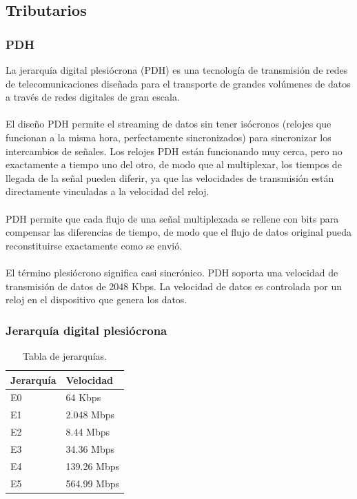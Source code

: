 \documentclass[12pt,letterpaper]{article}
\begin{document}
\subsection{Tributarios}
\subsubsection{PDH}
La jerarquía digital plesiócrona (PDH) es una tecnología de transmisión de redes de 
telecomunicaciones diseñada para el transporte de grandes volúmenes de datos a través de 
redes digitales de gran escala.
\\ \\
El diseño PDH permite el streaming de datos sin tener isócronos (relojes que funcionan a 
la misma hora, perfectamente sincronizados) para sincronizar los intercambios de señales. 
Los relojes PDH están funcionando muy cerca, pero no exactamente a tiempo uno del otro, 
de modo que al multiplexar, los tiempos de llegada de la señal pueden diferir, ya que 
las velocidades de transmisión están directamente vinculadas a la velocidad del reloj. 
\\ \\
PDH permite que cada flujo de una señal multiplexada se rellene con bits para compensar 
las diferencias de tiempo, de modo que el flujo de datos original pueda reconstituirse 
exactamente como se envió.
\\ \\
El término plesiócrono significa casi sincrónico. PDH soporta una velocidad de 
transmisión de datos de 2048 Kbps. La velocidad de datos es controlada por un reloj en 
el dispositivo que genera los datos. \cite{pdh}

\subsubsection{Jerarquía digital plesiócrona}
\begin{table}[ht]
    \centering
    \begin{tabular}{|l|l|}
    \hline
    Jerarquía & Velocidad \\ \hline
    E0 & 64 Kbps \\ \hline
    E1 & 2.048 Mbps \\ \hline
    E2 & 8.44 Mbps \\ \hline
    E3 & 34.36 Mbps \\ \hline
    E4 & 139.26 Mbps \\ \hline
    E5 & 564.99 Mbps \\ \hline
    \end{tabular}
    \caption{Tabla de jerarquías.}
    \label{my-label}
\end{table}
\end{document}
